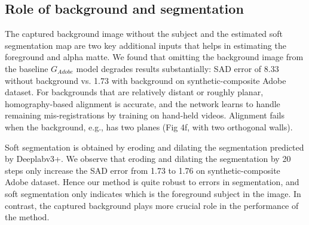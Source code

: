 \documentclass[10pt,twocolumn,letterpaper]{article}
\begin{document}
\subsection{Role of background and segmentation}
\label{sec:back_seg}

The captured background image without the subject and the estimated soft segmentation map are two key additional inputs that helps in estimating the foreground and alpha matte. We found that omitting the background image from the baseline $G_{Adobe}$ model degrades results substantially: SAD error of 8.33 without background vs. 1.73 with background on synthetic-composite Adobe dataset. For backgrounds that are relatively distant or roughly planar, homography-based alignment is accurate, and the network learns to handle remaining mis-registrations by training on hand-held videos. Alignment fails when the background, e.g., has two planes (Fig 4f, with two orthogonal walls).

Soft segmentation is obtained by eroding and dilating the segmentation predicted by Deeplabv3+. We observe that eroding and dilating the segmentation by 20 steps only increase the SAD error from 1.73 to 1.76 on synthetic-composite Adobe dataset. Hence our method is quite robust to errors in segmentation, and soft segmentation only indicates which is the foreground subject in the image. In contrast, the captured background plays more crucial role in the performance of the method.



 \fi
\end{document}
